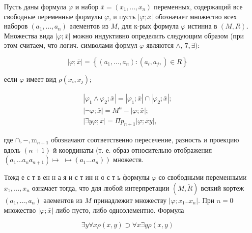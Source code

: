 \documentclass[10pt]{article}
\begin{document}
Пусть даны формула $\varphi$ и набор $\bar{x}=\left(x_{1}, \ldots, x_{n}\right)$ переменных, содержащий все свободные переменные формулы $\varphi$, и пусть $|\varphi ; \bar{x}|$ обозначает множество всех наборов $\left(a_{1}, \ldots, a_{n}\right)$ әлементов из $M$, для к-рых формула $\varphi$ истинна в $(M, R)$. Множества вида $|\varphi ; \bar{x}|$ можно индуктивно определить следующим образом (при этом считаем, что логич. символами формул $\varphi$ являются $\wedge$, $7, \exists):$



\[

|\varphi ; \bar{x}|=\left\{\left(a_{1}, \ldots, a_{n}\right):\left(a_{i}, a_{j},\right) \in R\right\}

\]



если $\varphi$ имеет вид $\rho\left(x_{i}, x_{j}\right)$;



\[

\begin{gathered}

\left|\varphi_{1} \wedge \varphi_{2} ; \bar{x}\right|=\left|\varphi_{1} ; \bar{x}\right| \cap\left|\varphi_{2} ; \bar{x}\right| ; \\

|\neg \varphi ; \bar{x}|=M^{n}-|\varphi ; \bar{x}| ; \\

|\exists y \varphi ; \bar{x}|=\Pi p_{n+1}|\varphi ; \bar{x} y|,

\end{gathered}

\]



где $\cap,-, \mathrm{m}_{n+1}$ обозначают соответственно пересечение, разность и проекцию вдоль $(n+1)$-й координаты (т. е. образ относительно отображения $\left(a_{1} \ldots a_{n} a_{n+1}\right) \mapsto$ $\left.\mapsto\left(a_{1} \ldots a_{n}\right)\right)$ множеств.



Тожд е с т в ен н а я и с т ин н о с т ь формулы $\varphi$ со свободными переменными $x_{1}, \ldots, x_{n}$ означает тогда, что для любой интерпретации $(\dot{M}, \ddot{R})$ всякий кортеж $\left(a_{1}, \ldots, a_{n}\right)$ әлементов из $M$ принадлежит множеству $\left|\varphi ; x_{1} . . x_{n}\right|$. При $n=0$ множество $|\varphi ; \bar{x}|$ либо пусто, либо одноэлементно. Формула



\[

\exists y \forall x \rho(x, y) \supset \forall x \exists y \rho(x, y)

\]
\end{document}
